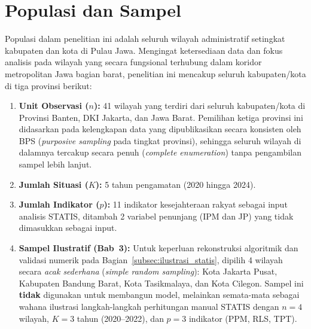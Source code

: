 \section{\normalsize Populasi dan Sampel}
Populasi dalam penelitian ini adalah seluruh wilayah administratif setingkat kabupaten dan kota di Pulau Jawa. Mengingat ketersediaan data dan fokus analisis pada wilayah yang secara fungsional terhubung dalam koridor metropolitan Jawa bagian barat, penelitian ini mencakup seluruh kabupaten/kota di tiga provinsi berikut:
\begin{enumerate}
    \item \textbf{Unit Observasi ($n$):} 41 wilayah yang terdiri dari seluruh kabupaten/kota di Provinsi Banten, DKI Jakarta, dan Jawa Barat. Pemilihan ketiga provinsi ini didasarkan pada kelengkapan data yang dipublikasikan secara konsisten oleh BPS (\textit{purposive sampling} pada tingkat provinsi), sehingga seluruh wilayah di dalamnya tercakup secara penuh (\textit{complete enumeration}) tanpa pengambilan sampel lebih lanjut.
    \item \textbf{Jumlah Situasi ($K$):} 5 tahun pengamatan (2020 hingga 2024).
    \item \textbf{Jumlah Indikator ($p$):} 11 indikator kesejahteraan rakyat sebagai input analisis STATIS, ditambah 2 variabel penunjang (IPM dan JP) yang tidak dimasukkan sebagai input.
    \item \textbf{Sampel Ilustratif (Bab~3):} Untuk keperluan rekonstruksi algoritmik dan validasi numerik pada Bagian~\ref{subsec:ilustrasi_statis}, dipilih 4 wilayah secara \textit{acak sederhana} (\textit{simple random sampling}): Kota Jakarta Pusat, Kabupaten Bandung Barat, Kota Tasikmalaya, dan Kota Cilegon. Sampel ini \textbf{tidak} digunakan untuk membangun model, melainkan semata-mata sebagai wahana ilustrasi langkah-langkah perhitungan manual STATIS dengan $n=4$ wilayah, $K=3$ tahun (2020--2022), dan $p=3$ indikator (PPM, RLS, TPT).
\end{enumerate}


